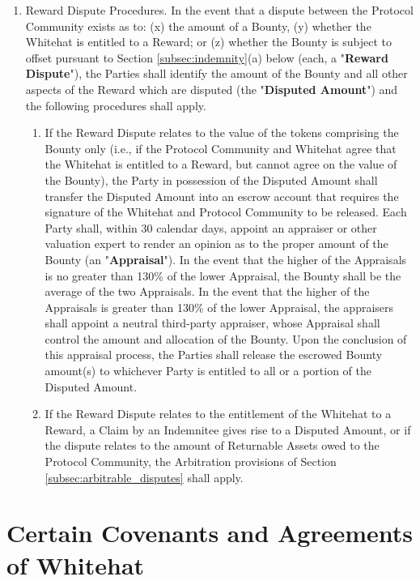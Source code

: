 \documentclass{article}
\begin{document}
\begin{enumerate}
    \item Reward Dispute Procedures. In the event that a dispute between the Protocol Community exists as to: (x) the amount of a Bounty, (y) whether the Whitehat is entitled to a Reward; or (z) whether the Bounty is subject to offset pursuant to Section \ref{subsec:indemnity}(a) below (each, a "\textbf{Reward Dispute}"), the Parties shall identify the amount of the Bounty and all other aspects of the Reward which are disputed (the "\textbf{Disputed Amount}") and the following procedures shall apply.

          \begin{enumerate}
              \item If the Reward Dispute relates to the value of the tokens comprising the Bounty only (i.e., if the Protocol Community and Whitehat agree that the Whitehat is entitled to a Reward, but cannot agree on the value of the Bounty), the Party in possession of the Disputed Amount shall transfer the Disputed Amount into an escrow account that requires the signature of the Whitehat and Protocol Community to be released. Each Party shall, within 30 calendar days, appoint an appraiser or other valuation expert to render an opinion as to the proper amount of the Bounty (an "\textbf{Appraisal}"). In the event that the higher of the Appraisals is no greater than 130\% of the lower Appraisal, the Bounty shall be the average of the two Appraisals. In the event that the higher of the Appraisals is greater than 130\% of the lower Appraisal, the appraisers shall appoint a neutral third-party appraiser, whose Appraisal shall control the amount and allocation of the Bounty. Upon the conclusion of this appraisal process, the Parties shall release the escrowed Bounty amount(s) to whichever Party is entitled to all or a portion of the Disputed Amount.

              \item If the Reward Dispute relates to the entitlement of the Whitehat to a Reward, a Claim by an Indemnitee gives rise to a Disputed Amount, or if the dispute relates to the amount of Returnable Assets owed to the Protocol Community, the Arbitration provisions of Section \ref{subsec:arbitrable_disputes} shall apply.

          \end{enumerate}
\end{enumerate}

\section{Certain Covenants and Agreements of Whitehat}\label{sec:convenants}
\end{document}
